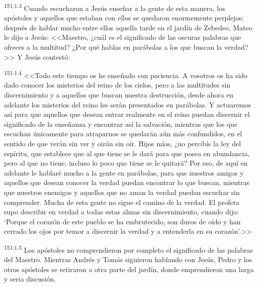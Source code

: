 \par 
\textsuperscript{151:1.3} Cuando escucharon a Jesús enseñar a la gente de esta manera, los apóstoles y aquellos que estaban con ellos se quedaron enormemente perplejos; después de hablar mucho entre ellos aquella tarde en el jardín de Zebedeo, Mateo le dijo a Jesús: <<Maestro, ¿cuál es el significado de las oscuras palabras que ofreces a la multitud? ¿Por qué hablas en parábolas a los que buscan la verdad?>> Y Jesús contestó:

\par 
\textsuperscript{151:1.4} <<Todo este tiempo os he enseñado con paciencia. A vosotros os ha sido dado conocer los misterios del reino de los cielos, pero a las multitudes sin discernimiento y a aquellos que buscan nuestra destrucción, desde ahora en adelante los misterios del reino les serán presentados en parábolas. Y actuaremos así para que aquellos que desean entrar realmente en el reino puedan discernir el significado de la enseñanza y encontrar así la salvación, mientras que los que escuchan únicamente para atraparnos se quedarán aún más confundidos, en el sentido de que verán sin ver y oirán sin oír. Hijos míos, ¿no percibís la ley del espíritu, que establece que al que tiene se le dará para que posea en abundancia, pero al que no tiene, incluso lo poco que tiene se le quitará? Por eso, de aquí en adelante le hablaré mucho a la gente en parábolas, para que nuestros amigos y aquellos que desean conocer la verdad puedan encontrar lo que buscan, mientras que nuestros enemigos y aquellos que no aman la verdad puedan escuchar sin comprender. Mucha de esta gente no sigue el camino de la verdad. El profeta supo describir en verdad a todas estas almas sin discernimiento, cuando dijo: `Porque el corazón de este pueblo se ha embrutecido, son duros de oído y han cerrado los ojos por temor a discernir la verdad y a entenderla en su corazón'.>>

\par 
\textsuperscript{151:1.5} Los apóstoles no comprendieron por completo el significado de las palabras del Maestro. Mientras Andrés y Tomás siguieron hablando con Jesús, Pedro y los otros apóstoles se retiraron a otra parte del jardín, donde emprendieron una larga y seria discusión.

